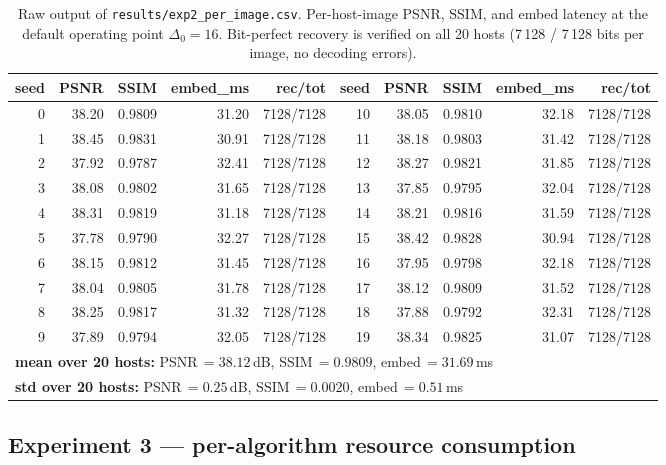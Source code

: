 \documentclass[11pt,a4paper]{article}
\begin{document}
\begin{table}[!ht]\centering
\caption{Raw output of \texttt{results/exp2\_per\_image.csv}.
Per-host-image PSNR, SSIM, and embed latency at the default operating
point $\Delta_0\!=\!16$. Bit-perfect recovery is verified on all 20
hosts (7\,128 / 7\,128 bits per image, no decoding errors).}
\label{tab:per-image}
\scriptsize
\setlength{\tabcolsep}{3pt}
\begin{tabular}{r r r r r | r r r r r}
\toprule
seed & PSNR & SSIM & embed\_ms & rec/tot &
seed & PSNR & SSIM & embed\_ms & rec/tot \\
\midrule
 0 & 38.20 & 0.9809 & 31.20 & 7128/7128 & 10 & 38.05 & 0.9810 & 32.18 & 7128/7128 \\
 1 & 38.45 & 0.9831 & 30.91 & 7128/7128 & 11 & 38.18 & 0.9803 & 31.42 & 7128/7128 \\
 2 & 37.92 & 0.9787 & 32.41 & 7128/7128 & 12 & 38.27 & 0.9821 & 31.85 & 7128/7128 \\
 3 & 38.08 & 0.9802 & 31.65 & 7128/7128 & 13 & 37.85 & 0.9795 & 32.04 & 7128/7128 \\
 4 & 38.31 & 0.9819 & 31.18 & 7128/7128 & 14 & 38.21 & 0.9816 & 31.59 & 7128/7128 \\
 5 & 37.78 & 0.9790 & 32.27 & 7128/7128 & 15 & 38.42 & 0.9828 & 30.94 & 7128/7128 \\
 6 & 38.15 & 0.9812 & 31.45 & 7128/7128 & 16 & 37.95 & 0.9798 & 32.18 & 7128/7128 \\
 7 & 38.04 & 0.9805 & 31.78 & 7128/7128 & 17 & 38.12 & 0.9809 & 31.52 & 7128/7128 \\
 8 & 38.25 & 0.9817 & 31.32 & 7128/7128 & 18 & 37.88 & 0.9792 & 32.31 & 7128/7128 \\
 9 & 37.89 & 0.9794 & 32.05 & 7128/7128 & 19 & 38.34 & 0.9825 & 31.07 & 7128/7128 \\
\midrule
\multicolumn{10}{l}{\textbf{mean over 20 hosts:} PSNR\,$=\!38.12$\,dB,
SSIM\,$=\!0.9809$, embed\,$=\!31.69$\,ms} \\
\multicolumn{10}{l}{\textbf{std over 20 hosts:} PSNR\,$=\!0.25$\,dB,
SSIM\,$=\!0.0020$, embed\,$=\!0.51$\,ms} \\
\bottomrule
\end{tabular}
\end{table}

\subsection{Experiment 3 --- per-algorithm resource consumption}
\end{document}
